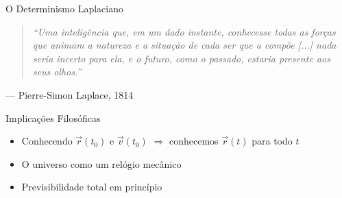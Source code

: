 \documentclass[aspectratio=169,12pt]{beamer}
\begin{document}
\begin{frame}{O Determinismo Laplaciano}
    \begin{quote}
        \itshape
        ``Uma inteligência que, em um dado instante, conhecesse todas as forças que animam a natureza e a situação de cada ser que a compõe [...] nada seria incerto para ela, e o futuro, como o passado, estaria presente aos seus olhos.''
    \end{quote}
    \hfill --- Pierre-Simon Laplace, 1814

    \vspace{0.5cm}

    \begin{block}{Implicações Filosóficas}
        \begin{itemize}
            \item Conhecendo $\vec{r}(t_0)$ e $\vec{v}(t_0)$ $\Rightarrow$ conhecemos $\vec{r}(t)$ para todo $t$
            \item O universo como um relógio mecânico
            \item Previsibilidade total em princípio
        \end{itemize}
    \end{block}
\end{frame}
\end{document}

